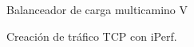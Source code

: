 \documentclass[10pt,spanish,xcolor={svgnames}]{beamer}
\newcommand{\nologo}{\setbeamertemplate{logo}{}} %
\begin{document}
{\nologo %
\begin{frame}{Balanceador de carga multicamino V}
\vspace*{-2em}
\begin{exampleblock}{\centering Creación de tráfico TCP con iPerf.}

\end{exampleblock}

\begin{figure}[h!]
	\centering	
	\par
\noindent{}
\end{figure}
\end{frame}}
\end{document}
